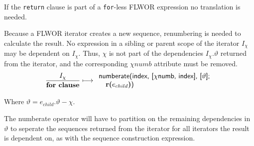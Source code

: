If the \texttt{return} clause is part of a \texttt{for}-less FLWOR expression no translation is needed.

Because a FLWOR iterator creates a new sequence, renumbering is needed to calculate the result. No expression in a
sibling or parent scope of the iterator $I_{\chi}$ may be dependent on $I_{\chi}$. Thus, $\chi$ is not part of the
dependencies $I_{\chi}.\vartheta$ returned from the iterator, and the corresponding $\chi{numb}$ attribute must be
removed.
\begin{equation}
\frac{I_{\chi}}{\mbox{\textbf{for clause}}}
\longmapsto
\begin{array}{l}
\mbox{\textsf{numberate(index, [}}\chi\mbox{\textsf{numb, index], [}}\vartheta\mbox{\textsf{];}} \\ \quad
\mbox{\textbf{r(}}e_{child}\mbox{\textbf{)}\textsf{)}}
\end{array}
\label{rule:trans:TD:forReturn}
\end{equation}

Where $\vartheta = e_{child}.\vartheta - \chi$.

The \textsf{numberate} operator will have to partition on the remaining dependencies in $\vartheta$ to seperate
the sequences returned from the iterator for all iterators the result is dependent on, as with the sequence
construction expression.

